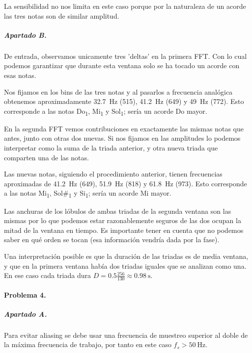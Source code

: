 La sensibilidad no nos limita en este caso porque por la naturaleza de un
acorde las tres notas son de similar amplitud.

\subparagraph{Apartado B.}

De entrada, observamos unicamente tres 'deltas' en la primera FFT. Con lo cual
podemos garantizar que durante esta ventana solo se ha tocado un acorde con
esas notas.

Nos fijamos en los bins de las tres notas y al pasarlos a frecuencia analógica
obtenemos aproximadamente \SI{32.7}{\hertz} (\num{515}), \SI{41.2}{\hertz}
(\num{649}) y \SI{49}{\hertz} (\num{772}). Esto corresponde a las notas
Do\textsubscript{1}, Mi\textsubscript{1} y Sol\textsubscript{1}; sería un
acorde Do mayor.

En la segunda FFT vemos contribuciones en exactamente las mismas notas que
antes, junto con otras dos nuevas. Si nos fijamos en las amplitudes lo podemos
interpretar como la suma de la triada anterior, y otra nueva triada que
comparten una de las notas.

Las nuevas notas, siguiendo el procedimiento anterior, tienen frecuencias
aproximadas de \SI{41.2}{\hertz} (\num{649}), \SI{51.9}{\hertz} (\num{818}) y
\SI{61.8}{\hertz} (\num{973}). Esto corresponde a las notas
Mi\textsubscript{1}, Sol\#\textsubscript{1} y Si\textsubscript{1}; sería un
acorde Mi mayor.

Las anchuras de los lóbulos de ambas triadas de la segunda ventana son las
mismas por lo que podemos estar razonablemente seguros de las dos ocupan la
mitad de la ventana en tiempo. Es importante tener en cuenta que no podemos
saber en qué orden se tocan (esa información vendría dada por la fase).

Una interpretación posible es que la duración de las triadas es de media
ventana, y que en la primera ventana había dos triadas iguales que se analizan
como una. En ese caso cada triada dura $D = \num{0.5} \frac{256}{130}
\approx \SI{0.98}{\second}$.

\finishpage
\startpage

\paragraph{Problema 4.}

\subparagraph{Apartado A.}

Para evitar aliasing se debe usar una frecuencia de muestreo superior al doble
de la máxima frecuencia de trabajo, por tanto en este caso $f_s >
\SI{50}{\hertz}$.

